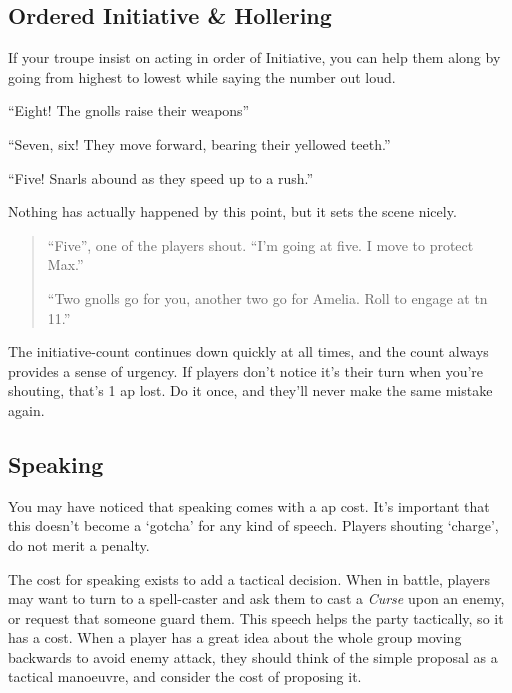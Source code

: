 \begin{multicols}{2}

\subsection{Ordered Initiative \& Hollering}

If your troupe insist on acting in order of Initiative, you can help them along by going from highest to lowest while saying the number out loud.

\begin{exampletext}

``Eight! The gnolls raise their weapons''

``Seven, six! They move forward, bearing their yellowed teeth.''

``Five! Snarls abound as they speed up to a rush.''

\end{exampletext}

Nothing has actually happened by this point, but it sets the scene nicely.

\begin{quote}

``Five'', one of the players shout.  ``I'm going at five.  I move to protect Max.''

``Two gnolls go for you, another two go for Amelia.  Roll to engage at \gls{tn} 11.''

\end{quote}

The initiative-count continues down quickly at all times, and the count always provides a sense of urgency.
If players don't notice it's their turn when you're shouting, that's 1 \gls{ap} lost.
Do it once, and they'll never make the same mistake again.

\subsection{Speaking}

You may have noticed that speaking comes with a \gls{ap} cost.
It's important that this doesn't become a `gotcha' for any kind of speech.
Players shouting `charge', do not merit a penalty.

The cost for speaking exists to add a tactical decision.
When in battle, players may want to turn to a spell-caster and ask them to cast a \textit{Curse} upon an enemy, or request that someone guard them.
This speech helps the party tactically, so it has a cost.
When a player has a great idea about the whole group moving backwards to avoid enemy attack, they should think of the simple proposal as a tactical manoeuvre, and consider the cost of proposing it.


\end{multicols}
